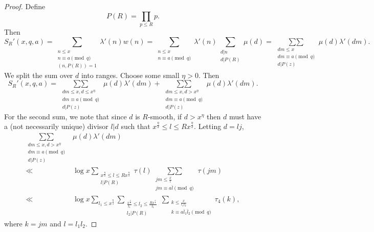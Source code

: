 \documentclass{amsart}
\begin{document}
\begin{proof}
Define
$$P(R)=\prod_{p\leq R}p.$$
Then
$$S_R'(x,q,a)=\sum_{\substack{n\leq x \\n\equiv a \pmod q \\ (n,P(R))=1}}\lambda'(n)w(n)=\sum_{\substack{n\leq x \\n\equiv a \pmod q}}\lambda'(n)\sum_{\substack{d|n \\ d|P(R)}}\mu(d)=\mathop{\sum\sum}\limits_{\substack{dm\leq x \\ dm\equiv a\pmod q \\ d|P(z)}}\mu(d)\lambda'(dm).$$
We split the sum over $d$ into ranges.  Choose some small $\eta>0$.  Then
$$S_R'(x,q,a)=\mathop{\sum\sum}\limits_{\substack{dm\leq x,d\leq x^\eta \\ dm\equiv a\pmod q \\ d|P(z)}}\mu(d)\lambda'(dm)+\mathop{\sum\sum}\limits_{\substack{dm\leq x,d>x^\eta \\ dm\equiv a\pmod q \\ d|P(z)}}\mu(d)\lambda'(dm).$$
For the second sum, we note that since $d$ is $R$-smooth, if $d>x^\eta$ then $d$ must have a (not necessarily unique) divisor $l|d$ such that $x^\frac \eta 2\leq l\leq Rx^\frac \eta 2$.  Letting $d=lj$,
\begin{align*}
\mathop{\sum\sum}\limits_{\substack{dm\leq x,d>x^\eta \\ dm\equiv a\pmod q \\ d|P(z)}}&\mu(d)\lambda'(dm)\\
\ll &\log x\sum_{\substack{x^\frac \eta 2\leq l\leq Rx^\frac \eta 2 \\ l|P(R)}}\tau(l)\mathop{\sum\sum}\limits_{\substack{jm\leq \frac xl \\ jm\equiv a\bar l\pmod q }}\tau(jm)\\
\ll & \log x\sum_{l_1\leq x^{\frac \eta 4}}\sum_{\substack{\frac{x^\frac \eta 2}{l_1}\leq l_2\leq \frac{Rx^\frac \eta 2}{l_1} \\ l_2|P(R)}}\mathop{\sum}\limits_{\substack{k\leq \frac x{l_1l_2} \\ k\equiv a\bar l_1\bar l_2\pmod q }}\tau_4(k),
\end{align*}
where $k=jm$ and $l=l_1l_2$.


\end{proof}
\end{document}
